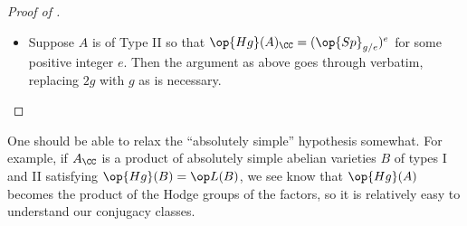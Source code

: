 \documentclass{article}
\begin{document}
\begin{proof}[Proof of ]
\begin{itemize}
		We are now ready to define our open set $U\subseteq G^{\op{mot}}(A)$ as requiring that the set of all eigenvalues of all the $X_\bullet$s be such that no two has a ratio which is an $M$th root of unity for some sufficiently large $M$ to be determined later (but depending only on $e$ and $N$).

		The current state is that we have some $s\in\op{MT}(A)$ such that $g_\ell^N=sg_{\ell'}^Ns^{-1}$ for sufficiently divisible $N$. To finish proving that $g_\ell\sim g_{\ell'}$, it will be enough to know that $X_{\ell i}\sim X_{\ell'i}$ for each $i$. Being given that $g_\ell^N=sg_{\ell'}^Ns^{-1}$ actually promises that $X_{\ell i}^N\sim X_{\ell'i}^N$ (in $\op{GSp}_{2g/e}$) for sufficiently divisible $N$, so we achieve $X_{\ell i}\sim X_{\ell'i}$ by \cite[Proposition~3.2]{noot-neat-class}.\footnote{This proposition applies to the $X$s but not to the $g$s directly because $\op{GSp}$ is connected while $G^{\mathrm{mot}}(A)$.}

		\item Suppose $A$ is of Type II so that $\op{Hg}(A)_\CC=({\op{Sp}_{g/e}})^e$ for some positive integer $e$. Then the argument as above goes through verbatim, replacing $2g$ with $g$ as is necessary.
		\qedhere
	\end{itemize}
\end{proof}
\begin{remark}
	One should be able to relax the ``absolutely simple'' hypothesis somewhat. For example, if $A_\CC$ is a product of absolutely simple abelian varieties $B$ of types I and II satisfying $\op{Hg}(B)=\op L(B)$, we see know that $\op{Hg}(A)$ becomes the product of the Hodge groups of the factors, so it is relatively easy to understand our conjugacy classes.
\end{remark}
\end{document}
